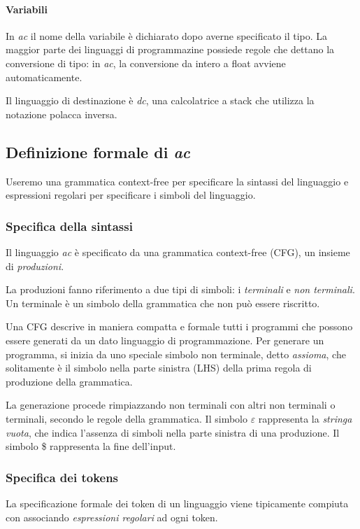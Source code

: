 \documentclass[11pt]{article}
\begin{document}
\paragraph*{Variabili} In \textit{ac} il nome della variabile è dichiarato dopo averne specificato il tipo.
La maggior parte dei linguaggi di programmazine possiede regole che dettano la conversione di tipo: in \textit{ac}, la 
conversione da intero a float avviene automaticamente.

Il linguaggio di destinazione è \textit{dc}, una calcolatrice a stack che utilizza la notazione polacca inversa.
\subsection{Definizione formale di \textit{ac}}
Useremo una grammatica context-free per specificare la sintassi del linguaggio e espressioni regolari per specificare i 
simboli del linguaggio.
\subsubsection{Specifica della sintassi}
Il linguaggio \textit{ac} è specificato da una grammatica context-free (CFG), un insieme di \textit{produzioni}.

La produzioni fanno riferimento a due tipi di simboli: i \textit{terminali} e \textit{non terminali}. Un terminale è un 
simbolo della grammatica che non può essere riscritto.

Una CFG descrive in maniera compatta e formale tutti i programmi che possono essere generati da un dato linguaggio di 
programmazione. Per generare un programma, si inizia da uno speciale simbolo non terminale, detto \textit{assioma}, che 
solitamente è il simbolo nella parte sinistra (LHS) della prima regola di produzione della grammatica. 

La generazione procede rimpiazzando non terminali con altri non terminali o terminali, secondo le regole della grammatica.
Il simbolo $\varepsilon$ rappresenta la \textit{stringa vuota}, che indica l'assenza di simboli nella parte sinistra di 
una produzione. Il simbolo \$ rappresenta la fine dell'input.

\subsubsection{Specifica dei tokens}
La specificazione formale dei token di un linguaggio viene tipicamente compiuta con associando \textit{espressioni 
regolari} ad ogni token.
\end{document}

